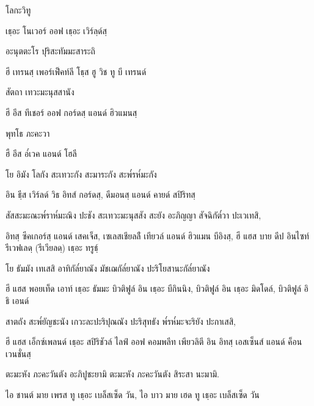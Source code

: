 {โลกะวิทู

\begin{english}
เธฺอะ โนเวอร์ ออฟ เธฺอะ เวิร์ลฺด์สฺ
\end{english}

อะนุตตะโร ปุริสะทัมมะสาระถิ

\begin{english}
ฮี เทรนสฺ เพอร์เฟ็คท์ลี โธฺส ฮู วิช ทู บี เทรนด์
\end{english}

สัตถา เทวะมะนุสสานัง

\begin{english}
ฮี อีส ทีเชอร์ ออฟ กอร์ดสฺ แอนด์ ฮิวแมนสฺ
\end{english}

พุทโธ ภะคะวา

\begin{english}
ฮื อีส อ๎เวค แอนด์ โฮลี
\end{english}

โย อิมัง โลกัง สะเทวะกัง สะมาระกัง สะพ๎รห๎มะกัง

\begin{english}
อิน ธฺีส เวิร์ลด์ วิธ อิทส์ กอร์ดสฺ, ดีมอนสฺ แอนด์ คายด์ สปิริทสฺ
\end{english}

สัสสะมะณะพ๎ราห๎มะณิง ปะชัง สะเทวะมะนุสสัง สะยัง อะภิญญา สัจฉิกัต๎วา ปะเวเทสิ,

\begin{english}
อิทสฺ ซีคเกอร์สฺ แอนด์ เสคเจ็ส, เซเลสเชียลล์ื เทียวล์ แอนด์ ฮิวแมน
	บีอิงสฺ, ฮี แฮส บาย ดีป อินไซท์   รีเวฟเลดฺ (รีเวียลดฺ)  เธฺอะ ทรูธฺ์
\end{english}

โย ธัมมัง เทเสสิ อาทิกัล๎ยาณัง มัชเฌกัล๎ยาณัง ปะริโยสานะกัล๎ยาณัง

\begin{english}
ฮี แฮส พอยเท็ด เอาท์ เธฺอะ ธัมมะ บิวติฟูล์ อิน เธฺอะ บีกินนิง,
บิวติฟูล์ อิน เธฺอะ มิดโดล์, บิวติฟูล์ อิ ธิ เอนด์
\end{english}

สาตถัง สะพ๎ยัญชะนัง เกวะละปะริปุณณัง ปะริสุทธัง พ๎รห๎มะจะริยัง ปะกาเสสิ,

\begin{english}
ฮี แฮส เอ็กซ์เพลนด์ เธฺอะ สปิริชัวล์ ไลฟ์ ออฟ คอมพลีท เพียวลิตี อิน อิทสฺ เอสเซ็นส์ แอนด์ ค็อนเวนชั่นสฺ
\end{english}

ตะมะหัง ภะคะวันตัง อะภิปูชะยามิ ตะมะหัง ภะคะวันตัง สิระสา นะมามิ.

\begin{english}
ไอ ชานต์ มาย เพรส ทู เธฺอะ เบล็สเซ็ด วัน, ไอ บาว มาย เฮด ทู เธฺอะ เบล็สเซ็ด วัน
\end{english}

}

